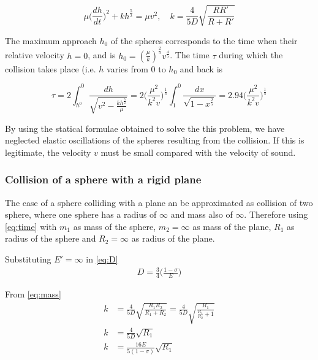 \begin{equation}
\mu \Big( \frac{dh}{dt} \Big) ^{2} + kh^{\frac{5}{2}} = \mu v^{2}, \quad k=\frac{4}{5D}\sqrt{\frac{RR'}{R+R'}}
\label{eq:mass}
\end{equation}


The maximum approach $h_{0}$ of the spheres corresponds to the time when their relative velocity $h = 0$, and is $h_{0} = (\frac{\mu}{k})^{\frac{2}{5}} v^{\frac{4}{5}}$.
The time $\tau$ during which the collision takes place (i.e. $h$ varies from 0 to $h_{0}$ and back is

\begin{equation}
\tau = 2 \int_{h^{0}}^{0} \frac{dh}{\sqrt{v^{2} - \frac{kh^{\frac{5}{2}}}{\mu} }} = 2 \Big( \frac{\mu^{2}}{k^{2}v} \Big) ^{\frac{1}{5}} \int_{1}^{0} \frac{dx}{\sqrt{1-x^{\frac{2}{5}}}} = 2.94 \Big( \frac{\mu^{2}}{k^{2}v} \Big) ^{\frac{1}{5}}
\label{eq:time}
\end{equation}
 
By using the statical formulae obtained to solve the this problem, we have neglected elastic oscillations of the spheres resulting from the collision. If this is legitimate, the velocity $v$ must be small compared with the velocity of sound.


\subsubsection{Collision of a sphere with a rigid plane}

The case of a sphere colliding with a plane an be approximated as collision of two sphere, where one sphere has a radius of $\infty$ and mass also of $\infty$. Therefore using \ref{eq:time} with $m_{1}$ as mass of the sphere, $m_{2}=\infty$ as mass of the plane, $R_{1}$ as radius of the sphere and $R_{2}=\infty$ as radius of the plane.

Substituting $E'=\infty$ in \ref{eq:D}
\begin{align*}
D = \frac{3}{4} \Big( \frac{1 - \sigma}{E} \Big)
\end{align*}

From \ref{eq:mass} 
\begin{align*}
k &= \frac{4}{5D} \sqrt{\frac{R_{1} R_{2}}{R_{1} + R_{2}}}= \frac{4}{5D} \sqrt{\frac{R_{1}}{\frac{R_{1}}{R_{2}} + 1}}\\
k &= \frac{4}{5D} \sqrt{R_{1}} \\
k &= \frac{16E}{5(1-\sigma)} \sqrt{R_{1}}
\end{align*}

